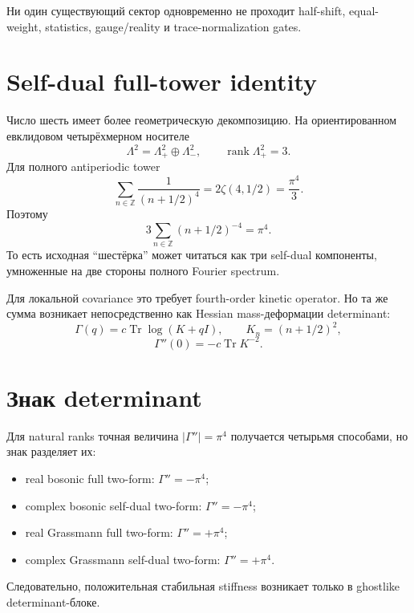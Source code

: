 \documentclass[12pt,a4paper]{article}
\DeclareMathOperator{\Tr}{Tr}
\begin{document}
Ни один существующий сектор одновременно не проходит half-shift, equal-weight,
statistics, gauge/reality и trace-normalization gates.

\section{Self-dual full-tower identity}

Число шесть имеет более геометрическую декомпозицию. На ориентированном
евклидовом четырёхмерном носителе
\begin{equation}
 \Lambda^2=\Lambda^2_+\oplus\Lambda^2_- ,
 \qquad \operatorname{rank}\Lambda^2_+=3.
\end{equation}
Для полного antiperiodic tower
\begin{equation}
 \sum_{n\in\mathbb Z}\frac1{(n+1/2)^4}
 =2\zeta(4,1/2)=\frac{\pi^4}{3}.
\end{equation}
Поэтому
\begin{equation}
 3\sum_{n\in\mathbb Z}(n+1/2)^{-4}=\pi^4.
\end{equation}
То есть исходная ``шестёрка'' может читаться как три self-dual компоненты,
умноженные на две стороны полного Fourier spectrum.

Для локальной covariance это требует fourth-order kinetic operator. Но та же
сумма возникает непосредственно как Hessian mass-деформации determinant:
\begin{equation}
 \Gamma(q)=c\Tr\log(K+qI),
 \qquad K_n=(n+1/2)^2,
\end{equation}
\begin{equation}
 \Gamma''(0)=-c\Tr K^{-2}.
\end{equation}

\section{Знак determinant}

Для natural ranks точная величина $|\Gamma''|=\pi^4$ получается четырьмя
способами, но знак разделяет их:
\begin{itemize}
 \item real bosonic full two-form: $\Gamma''=-\pi^4$;
 \item complex bosonic self-dual two-form: $\Gamma''=-\pi^4$;
 \item real Grassmann full two-form: $\Gamma''=+\pi^4$;
 \item complex Grassmann self-dual two-form: $\Gamma''=+\pi^4$.
\end{itemize}
Следовательно, положительная стабильная stiffness возникает только в
ghostlike determinant-блоке.
\end{document}
